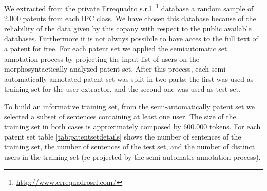 \documentclass[b5paper,]{book}
\let\rmarkdownfootnote\footnote%
\def\footnote{\protect\rmarkdownfootnote}
\theoremstyle{definition}
\theoremstyle{definition}
\theoremstyle{definition}
\theoremstyle{remark}
\begin{document}
We extracted from the private Errequadro s.r.l. \footnote{\url{http://www.errequadrosrl.com/}}
database a random sample of 2.000 patents from each IPC class. We have
chosen this database because of the reliability of the data given by
this copany with respect to the public available databases. Furthermore
it is not always possibile to have acces to the full text of a patent
for free. For each patent set we applied the semiautomatic set
annotation process by projecting the input list of users on the
morphosyntactically analyzed patent set. After this process, each
semi-automatically annotated patent set was split in two parts: the
first was used as training set for the user extractor, and the second
one was used as test set.

To build an informative training set, from the semi-automatically patent
set we selected a subset of sentences containing at least one user. The
size of the training set in both cases is approximately composed by
600.000 tokens. For each patent set table \ref{tab:patentsetdetails}
shows the number of sentences of the training set, the number of
sentences of the test set, and the number of distinct users in the
training set (re-projected by the semi-automatic annotation process).
\end{document}
